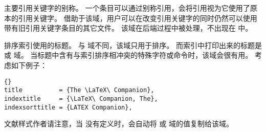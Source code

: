 \begin{fieldlist}




主要引用关键字的别称。
一个条目可以通过别称引用，\biblatex 会将引用视为它使用了原本的引用关键字。
借助于该域，用户可以在改变引用关键字的同时仍然可以使用带有旧引用关键字条目的其它文件。
该域在后端过程中被处理，不出现在  中。





排序索引使用的标题。
与  域不同，该域只用于排序。
而索引中打印出来的标题是  或 域。
当标题中含有与索引排序相冲突的特殊字符或命令时，该域会很有用。
考虑如下例子：

\begin{lstlisting}[style=bibtex]{}
title          = {The \LaTeX\ Companion},
indextitle     = {\LaTeX\ Companion, The},
indexsorttitle = {LATEX Companion},
\end{lstlisting}
%
文献样式作者请注意，当  没有定义时，\biblatex 会自动将  或  域的值复制给该域。


\end{fieldlist}
